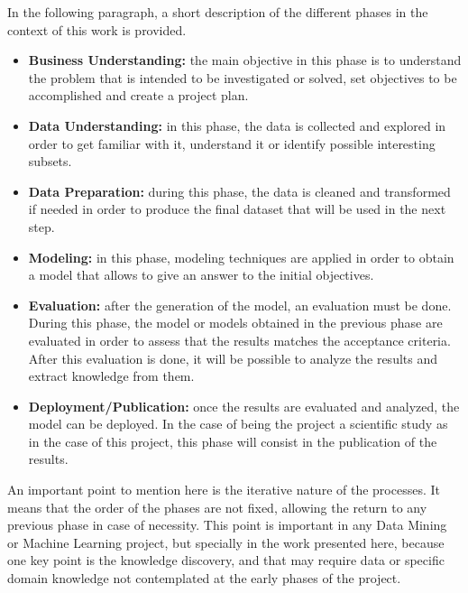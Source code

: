 In the following paragraph, a short description of the different phases in the context of this work is provided.

\begin{itemize}
    \item \textbf{Business Understanding:} the main objective in this phase is to understand the problem that is intended to be investigated or solved, set objectives to be accomplished and create a project plan.
    \item \textbf{Data Understanding:} in this phase, the data is collected and explored in order to get familiar with it, understand it or identify possible interesting subsets.
    \item \textbf{Data Preparation:} during this phase, the data is cleaned and transformed if needed in order to produce the final dataset that will be used in the next step.
    \item \textbf{Modeling:} in this phase, modeling techniques are applied in order to obtain a model that allows to give an answer to the initial objectives.
    \item \textbf{Evaluation:} after the generation of the model, an evaluation must be done. During this phase, the model or models obtained in the previous phase are evaluated in order to assess that the results matches the acceptance criteria. After this evaluation is done, it will be possible to analyze the results and extract knowledge from them.
    \item \textbf{Deployment/Publication:} once the results are evaluated and analyzed, the model can be deployed. In the case of being the project a scientific study as in the case of this project, this phase will consist in the publication of the results.
\end{itemize}

An important point to mention here is the iterative nature of the processes. It means that the order of the phases are not fixed, allowing the return to any previous phase in case of necessity.
This point is important in any Data Mining or Machine Learning project, but specially in the work presented here, because one key point is the knowledge discovery, and that may require data or specific domain knowledge not contemplated at the early phases of the project.
